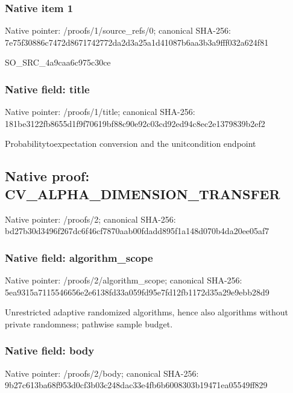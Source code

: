 \documentclass[10pt,a4paper]{article}
\begin{document}
\subsubsection{Native item 1}


Native pointer: /proofs/1/source\_refs/0; canonical SHA-256: 7e75f30886c7472d86717427\allowbreak{}72da2d3a25a1d41087b6aa3b\allowbreak{}3a9fff032a624f81


SO\_SRC\_4a9caa6c975c30ce


\subsubsection{Native field: title}


Native pointer: /proofs/1/title; canonical SHA-256: 181be3122fb8655d1f9f7061\allowbreak{}9bf88c90e92c03cd92ed94c8\allowbreak{}ec2e1379839b2ef2


Probabilitytoexpectation conversion and the unitcondition endpoint


\subsection{Native proof: CV\_ALPHA\_DIMENSION\_TRANSFER}


Native pointer: /proofs/2; canonical SHA-256: bd27b30d3496f267dc6f46cf\allowbreak{}7870aab00fdadd895f1a148d\allowbreak{}070b4da20ee05af7



\subsubsection{Native field: algorithm\_scope}


Native pointer: /proofs/2/algorithm\_scope; canonical SHA-256: 5ea9315a7115546656e2e613\allowbreak{}8fd33a059fd95e7fd12fb117\allowbreak{}2d35a29e9ebb28d9


Unrestricted adaptive randomized algorithms, hence also algorithms without private randomness; pathwise sample budget.


\subsubsection{Native field: body}


Native pointer: /proofs/2/body; canonical SHA-256: 9b27c613ba68f953d0cf3b03\allowbreak{}c248dac33e4fb6b6008303b1\allowbreak{}9471ea05549ff829
\end{document}
